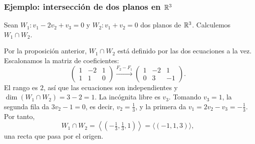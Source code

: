 \begin{frame}[allowframebreaks]
    \frametitle{Ejemplo: intersección de dos planos en $\mathbb{R}^3$}

    \begin{example}
        Sean $W_1\colon v_1-2v_2+v_3=0$ y $W_2\colon v_1+v_2=0$ dos
        planos de $\mathbb{R}^3$. Calculemos $W_1\cap W_2$.
    \end{example}

    Por la proposición anterior, $W_1\cap W_2$ está definido por las dos
    ecuaciones a la vez. Escalonamos la matriz de coeficientes:
    \[
        \begin{pmatrix}1&-2&1\\1&1&0\end{pmatrix}
        \xrightarrow{F_2-F_1}
        \begin{pmatrix}1&-2&1\\0&3&-1\end{pmatrix}.
    \]
    El rango es $2$, así que las ecuaciones son independientes y
    $\dim(W_1\cap W_2)=3-2=1$. La incógnita libre es $v_3$. Tomando
    $v_3=1$, la segunda fila da $3v_2-1=0$, es decir, $v_2=\frac13$, y la
    primera da $v_1=2v_2-v_3=-\frac13$. Por tanto,
    \[
        W_1\cap W_2=\left\langle\left(-\tfrac13,\tfrac13,1\right)\right\rangle
        =\langle(-1,1,3)\rangle,
    \]
    una recta que pasa por el origen.

    \framebreak


\end{frame}
